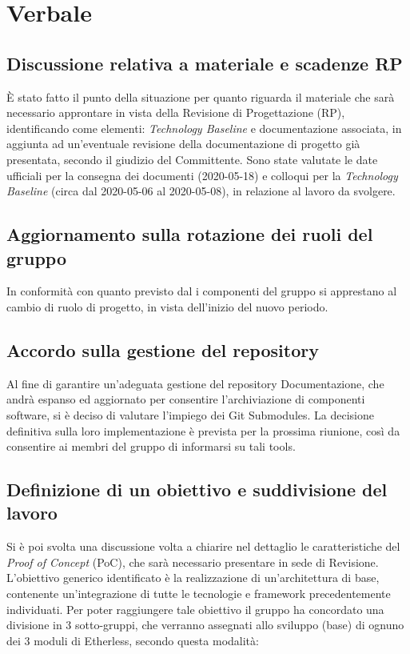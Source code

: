 \section{Verbale}

	\subsection{Discussione relativa a materiale e scadenze RP}
	È stato fatto il punto della situazione per quanto riguarda il materiale che sarà necessario approntare in vista della Revisione di Progettazione (RP), identificando come elementi: \textit{Technology Baseline} e documentazione associata, in aggiunta ad un'eventuale revisione della documentazione di progetto già presentata, secondo il giudizio del Committente.
	Sono state valutate le date ufficiali per la consegna dei documenti (2020-05-18) e colloqui per la \textit{Technology Baseline} (circa dal 2020-05-06 al 2020-05-08), in relazione al lavoro da svolgere.

	\subsection{Aggiornamento sulla rotazione dei ruoli del gruppo}
	In conformità con quanto previsto dal \PdP{} i componenti del gruppo si apprestano al cambio di ruolo di progetto, in vista dell'inizio del nuovo periodo.

	\subsection{Accordo sulla gestione del repository}
	Al fine di garantire un'adeguata gestione del repository Documentazione, che andrà espanso ed aggiornato per consentire l'archiviazione di componenti software, si è deciso di valutare l'impiego dei Git Submodules. La decisione definitiva sulla loro implementazione è prevista per la prossima riunione, così da consentire ai membri del gruppo di informarsi su tali tools.

	\subsection{Definizione di un obiettivo e suddivisione del lavoro}
	Si è poi svolta una discussione volta a chiarire nel dettaglio le caratteristiche del \textit{Proof of Concept} (PoC), che sarà necessario presentare in sede di Revisione. L'obiettivo generico identificato è la realizzazione di un'architettura di base, contenente un'integrazione di tutte le tecnologie e framework precedentemente individuati.
	Per poter raggiungere tale obiettivo il gruppo ha concordato una divisione in 3 sotto-gruppi, che verranno assegnati allo sviluppo (base) di ognuno dei 3 moduli di Etherless, secondo questa modalità:
